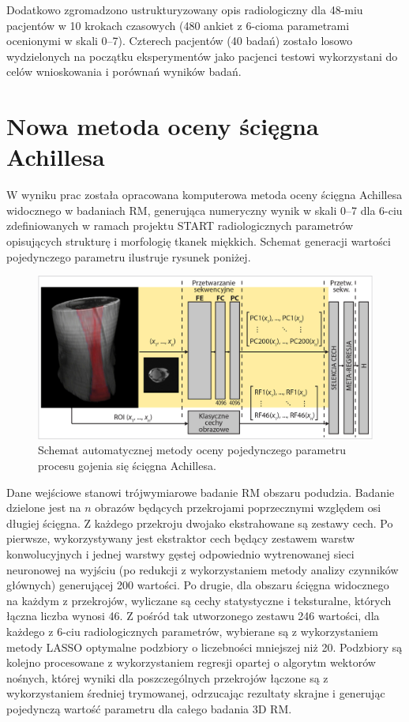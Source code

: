 Dodatkowo zgromadzono ustrukturyzowany opis radiologiczny dla 48-miu pacjentów w 10 krokach czasowych (480 ankiet z 6-cioma parametrami ocenionymi w skali 0--7). Czterech pacjentów (40 badań) zostało losowo wydzielonych na początku eksperymentów jako pacjenci testowi wykorzystani do celów wnioskowania i porównań wyników badań.

{\let\clearpage\relax\chapter*{Nowa metoda oceny ścięgna Achillesa}}

W wyniku prac została opracowana komputerowa metoda oceny ścięgna Achillesa widocznego w badaniach RM, generująca numeryczny wynik w skali 0--7 dla 6-ciu zdefiniowanych w ramach projektu START radiologicznych parametrów opisujących strukturę i morfologię tkanek miękkich. Schemat generacji wartości pojedynczego parametru ilustruje rysunek poniżej. 
\begin{figure}[h!]
	\includegraphics[width=\textwidth]{figures/net.jpg}
	\caption{Schemat automatycznej metody oceny pojedynczego parametru procesu gojenia się ścięgna Achillesa.} \label{fig:net}
\end{figure}

Dane wejściowe stanowi trójwymiarowe badanie RM obszaru podudzia. Badanie dzielone jest na $n$ obrazów będących przekrojami poprzecznymi względem osi długiej ścięgna. Z każdego przekroju dwojako ekstrahowane są zestawy cech. Po pierwsze, wykorzystywany jest ekstraktor cech będący zestawem warstw konwolucyjnych i jednej warstwy gęstej odpowiednio wytrenowanej sieci neuronowej na wyjściu (po redukcji z wykorzystaniem metody analizy czynników głównych) generującej 200 wartości. Po drugie, dla obszaru ścięgna widocznego na każdym z przekrojów, wyliczane są cechy statystyczne i teksturalne, których łączna liczba wynosi 46. Z pośród tak utworzonego zestawu 246 wartości, dla każdego z 6-ciu radiologicznych parametrów, wybierane są z wykorzystaniem metody LASSO optymalne podzbiory o liczebności mniejszej niż 20. Podzbiory są kolejno procesowane z wykorzystaniem regresji opartej o algorytm wektorów nośnych, której wyniki dla poszczególnych przekrojów łączone są z wykorzystaniem średniej trymowanej, odrzucając rezultaty skrajne i generując pojedynczą wartość parametru dla całego badania 3D RM.   


